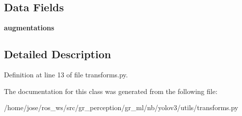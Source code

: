 \subsection*{Data Fields}
\begin{DoxyCompactItemize}
\item 
\mbox{\label{classutils_1_1transforms_1_1ImgAug_adb4bc91b009613d0ee71bca4210551bc}} 
{\bfseries augmentations}
\end{DoxyCompactItemize}


\subsection{Detailed Description}


Definition at line 13 of file transforms.\+py.



The documentation for this class was generated from the following file\+:\begin{DoxyCompactItemize}
\item 
/home/jose/ros\+\_\+ws/src/gr\+\_\+perception/gr\+\_\+ml/nb/yolov3/utils/transforms.\+py\end{DoxyCompactItemize}
